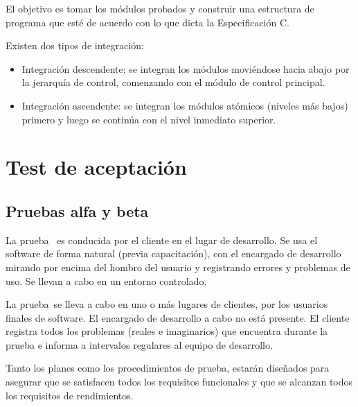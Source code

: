El objetivo es tomar los módulos probados y construir una estructura de programa que esté de acuerdo con lo que dicta la Especificación C.

Existen dos tipos de integración:
\begin{itemize}
	\item Integración descendente: se integran los módulos moviéndose hacia abajo por la jerarquía de control, comenzando con el módulo de control principal.
	\item Integración ascendente: se integran los módulos atómicos (niveles más bajos) primero y luego se continúa con el nivel inmediato superior.
\end{itemize}

\section{Test de aceptación}
\subsection{Pruebas alfa y beta}

La prueba \textalpha \, es conducida por el cliente en el lugar de desarrollo. Se usa el software de forma natural (previa capacitación), con el encargado de desarrollo mirando por encima del hombro del usuario y registrando errores y problemas de uso. Se llevan a cabo en un entorno controlado.

La prueba \textbeta \,se lleva a cabo en uno o más lugares de clientes, por los usuarios finales de software. El encargado de desarrollo a cabo no está presente. El cliente registra todos los problemas (reales e imaginarios) que encuentra durante la prueba e informa a intervalos regulares al equipo de desarrollo.

Tanto los planes como los procedimientos de prueba, estarán diseñados para asegurar que se satisfacen todos los requisitos funcionales y que se alcanzan todos los requisitos de rendimientos.